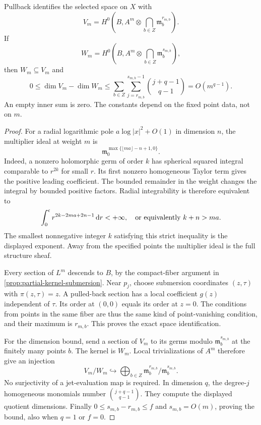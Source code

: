 \begin{proposition}\label{prop:isolated-pole-section-descent}
Pullback identifies the selected space on $X$ with
\[
 V_m=H^0\left(B,A^m\otimes
                       \bigcap_{b\in Z}\mathfrak m_b^{r_{m,b}}\right).
\]
If
\[
 W_m=H^0\left(B,A^m\otimes
                       \bigcap_{b\in Z}\mathfrak m_b^{s_{m,b}}\right),
\]
then $W_m\subseteq V_m$ and
\[
 0\leq\dim V_m-\dim W_m
 \leq\sum_{b\in Z}\sum_{j=r_{m,b}}^{s_{m,b}-1}
                         \binom{j+q-1}{q-1}
 =O(m^{q-1}).
\]
An empty inner sum is zero. The constants depend on the fixed point data, not on $m$.
\end{proposition}
\begin{proof}
For a radial logarithmic pole $a\log|x|^2+O(1)$ in dimension $n$, the multiplier ideal at weight $m$ is
\[
 \mathfrak m_0^{\max\{\lfloor ma\rfloor-n+1,0\}}.
\]
Indeed, a nonzero holomorphic germ of order $k$ has spherical squared integral comparable to $r^{2k}$ for small $r$. Its first nonzero homogeneous Taylor term gives the positive leading coefficient. The bounded remainder in the weight changes the integral by bounded positive factors. Radial integrability is therefore equivalent to
\[
 \int_0^\epsilon r^{2k-2ma+2n-1}\,\mathrm{d}r<+\infty,
 \quad\hbox{or equivalently }k+n>ma.
\]
The smallest nonnegative integer $k$ satisfying this strict inequality is the displayed exponent. Away from the specified points the multiplier ideal is the full structure sheaf.

Every section of $L^m$ descends to $B$, by the compact-fiber argument in \cref{prop:partial-kernel-submersion}. Near $p_j$, choose submersion coordinates $(z,\tau)$ with $\pi(z,\tau)=z$. A pulled-back section has a local coefficient $g(z)$ independent of $\tau$. Its order at $(0,0)$ equals its order at $z=0$. The conditions from points in the same fiber are thus the same kind of point-vanishing condition, and their maximum is $r_{m,b}$. This proves the exact space identification.

For the dimension bound, send a section of $V_m$ to its germs modulo $\mathfrak m_b^{s_{m,b}}$ at the finitely many points $b$. The kernel is $W_m$. Local trivializations of $A^m$ therefore give an injection
\[
 V_m/W_m\hookrightarrow
       \bigoplus_{b\in Z}\mathfrak m_b^{r_{m,b}}/
                                      \mathfrak m_b^{s_{m,b}}.
\]
No surjectivity of a jet-evaluation map is required. In dimension $q$, the degree-$j$ homogeneous monomials number $\binom{j+q-1}{q-1}$. They compute the displayed quotient dimensions. Finally $0\leq s_{m,b}-r_{m,b}\leq f$ and $s_{m,b}=O(m)$, proving the bound, also when $q=1$ or $f=0$.
\end{proof}

